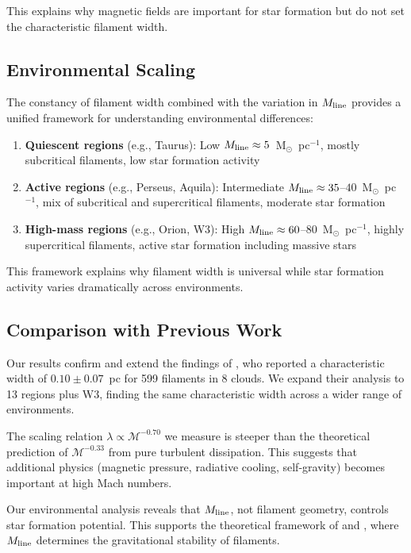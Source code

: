 \documentclass{mnras}
\begin{document}
This explains why magnetic fields are important for star formation but do not set the characteristic filament width.

\subsection{Environmental Scaling}

The constancy of filament width combined with the variation in $M_{\rm line}$ provides a unified framework for understanding environmental differences:

\begin{enumerate}
  \item \textbf{Quiescent regions} (e.g., Taurus): Low $M_{\rm line} \approx 5$~M$_\odot$~pc$^{-1}$, mostly subcritical filaments, low star formation activity

  \item \textbf{Active regions} (e.g., Perseus, Aquila): Intermediate $M_{\rm line} \approx 35$--$40$~M$_\odot$~pc$^{-1}$, mix of subcritical and supercritical filaments, moderate star formation

  \item \textbf{High-mass regions} (e.g., Orion, W3): High $M_{\rm line} \approx 60$--$80$~M$_\odot$~pc$^{-1}$, highly supercritical filaments, active star formation including massive stars
\end{enumerate}

This framework explains why filament width is universal while star formation activity varies dramatically across environments.

\subsection{Comparison with Previous Work}

Our results confirm and extend the findings of \citet{Arzoumanian2019}, who reported a characteristic width of $0.10 \pm 0.07$~pc for 599 filaments in 8 clouds. We expand their analysis to 13 regions plus W3, finding the same characteristic width across a wider range of environments.

The scaling relation $\lambda \propto \mathcal{M}^{-0.70}$ we measure is steeper than the theoretical prediction of $\mathcal{M}^{-0.33}$ from pure turbulent dissipation. This suggests that additional physics (magnetic pressure, radiative cooling, self-gravity) becomes important at high Mach numbers.

Our environmental analysis reveals that $M_{\rm line}$, not filament geometry, controls star formation potential. This supports the theoretical framework of \citet{Inutsuka1997} and \citet{Andre2014}, where $M_{\rm line}$ determines the gravitational stability of filaments.
\end{document}
